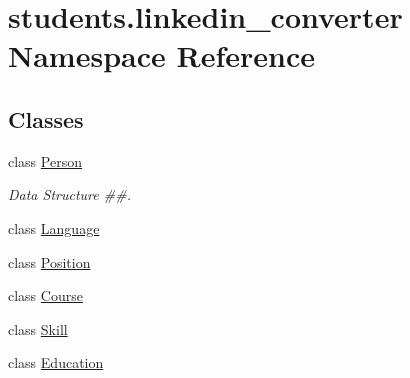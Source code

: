 \hypertarget{namespacestudents_1_1linkedin__converter}{\section{students.\-linkedin\-\_\-converter Namespace Reference}
\label{namespacestudents_1_1linkedin__converter}
}
\subsection*{Classes}
\begin{DoxyCompactItemize}
\item 
class \hyperlink{classstudents_1_1linkedin__converter_1_1_person}{Person}
\begin{DoxyCompactList}\small\item\em Data Structure \#\#. \end{DoxyCompactList}\item 
class \hyperlink{classstudents_1_1linkedin__converter_1_1_language}{Language}
\item 
class \hyperlink{classstudents_1_1linkedin__converter_1_1_position}{Position}
\item 
class \hyperlink{classstudents_1_1linkedin__converter_1_1_course}{Course}
\item 
class \hyperlink{classstudents_1_1linkedin__converter_1_1_skill}{Skill}
\item 
class \hyperlink{classstudents_1_1linkedin__converter_1_1_education}{Education}
\end{DoxyCompactItemize}
